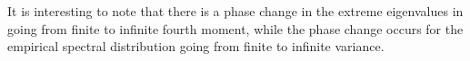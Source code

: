 It is interesting to note that there is a phase change in the extreme eigenvalues in going from finite to infinite fourth moment, while the phase change occurs for the empirical spectral distribution going from finite to infinite variance.

\par





